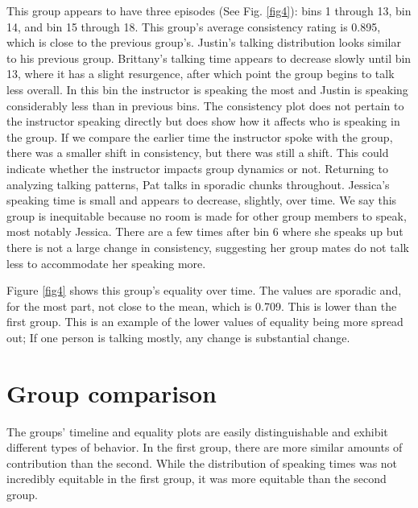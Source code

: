 \documentclass[aps,pra,reprint,noshowpacs,superscriptaddress, nofootinbib]{revtex4-1}
\begin{document}
    This group appears to have three episodes (See Fig. \ref{fig4}): bins 1 through 13, bin 14, and bin 15 through 18. This group's average consistency rating is 0.895, which is close to the previous group's. Justin's talking distribution looks similar to his previous group. Brittany's talking time appears to decrease slowly until bin 13, where it has a slight resurgence, after which point the group begins to talk less overall. In this bin the instructor is speaking the most and Justin is speaking considerably less than in previous bins. The consistency plot does not pertain to the instructor speaking directly but does show how it affects who is speaking in the group. If we compare the earlier time the instructor spoke with the group, there was a smaller shift in consistency, but there was still a shift. This could indicate whether the instructor impacts group dynamics or not. Returning to analyzing talking patterns, Pat talks in sporadic chunks throughout. Jessica's speaking time is small and appears to decrease, slightly, over time. We say this group is inequitable because no room is made for other group members to speak, most notably Jessica. There are a few times after bin 6 where she speaks up but there is not a large change in consistency, suggesting her group mates do not talk less to accommodate her speaking more.%
%
%
    
    Figure \ref{fig4} shows this group's equality over time. The values are sporadic and, for the most part, not close to the mean, which is 0.709. This is lower than the first group. This is an example of the lower values of equality being more spread out; If one person is talking mostly, any change is substantial change. 
% 
% 

\section{Group comparison}
 The groups' timeline and equality plots are easily distinguishable and exhibit different types of behavior. In the first group, there are more similar amounts of contribution than the second. While the distribution of speaking times was not incredibly equitable in the first group, it was more equitable than the second group.
 
\end{document}
